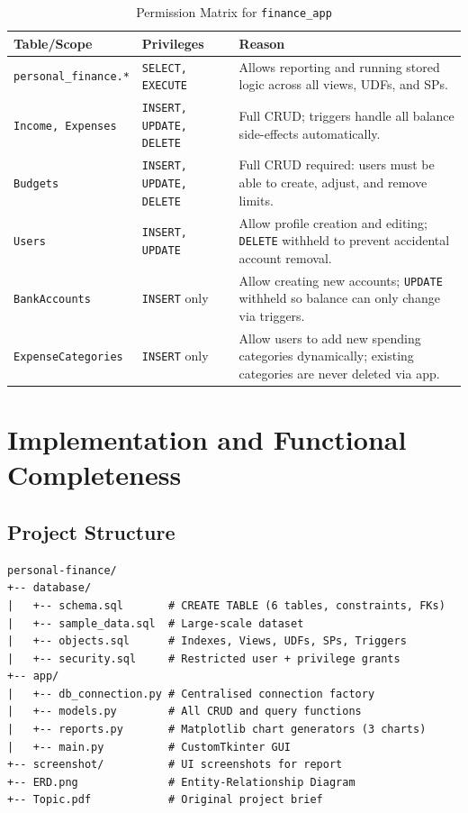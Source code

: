 \documentclass[12pt, a4paper]{article}
\begin{document}
\begin{table}[H]
\centering
\caption{Permission Matrix for \texttt{finance\_app}}
\label{tab:security_matrix}
\begin{tabularx}{\textwidth}{l l X}
\toprule
\textbf{Table/Scope} & \textbf{Privileges} & \textbf{Reason} \\
\midrule
\texttt{personal\_finance.*}  & \texttt{SELECT, EXECUTE}
  & Allows reporting and running stored logic across all views, UDFs, and SPs. \\
\addlinespace
\texttt{Income, Expenses} & \texttt{INSERT, UPDATE, DELETE}
  & Full CRUD; triggers handle all balance side-effects automatically. \\
\addlinespace
\texttt{Budgets} & \texttt{INSERT, UPDATE, DELETE}
  & Full CRUD required: users must be able to create, adjust, and remove limits. \\
\addlinespace
\texttt{Users} & \texttt{INSERT, UPDATE}
  & Allow profile creation and editing; \texttt{DELETE} withheld to prevent
    accidental account removal. \\
\addlinespace
\texttt{BankAccounts} & \texttt{INSERT} only
  & Allow creating new accounts; \texttt{UPDATE} withheld so balance can only
    change via triggers. \\
\addlinespace
\texttt{ExpenseCategories} & \texttt{INSERT} only
  & Allow users to add new spending categories dynamically; existing categories
    are never deleted via app. \\
\bottomrule
\end{tabularx}
\end{table}

\newpage

\section{Implementation and Functional Completeness}

\subsection{Project Structure}

\begin{lstlisting}[language={}, basicstyle=\ttfamily\small, frame=single,
                   backgroundcolor=\color{codebg}, caption={Project Directory Structure}]
personal-finance/
+-- database/
|   +-- schema.sql       # CREATE TABLE (6 tables, constraints, FKs)
|   +-- sample_data.sql  # Large-scale dataset
|   +-- objects.sql      # Indexes, Views, UDFs, SPs, Triggers
|   +-- security.sql     # Restricted user + privilege grants
+-- app/
|   +-- db_connection.py # Centralised connection factory
|   +-- models.py        # All CRUD and query functions
|   +-- reports.py       # Matplotlib chart generators (3 charts)
|   +-- main.py          # CustomTkinter GUI
+-- screenshot/          # UI screenshots for report
+-- ERD.png              # Entity-Relationship Diagram
+-- Topic.pdf            # Original project brief
\end{lstlisting}
\end{document}
